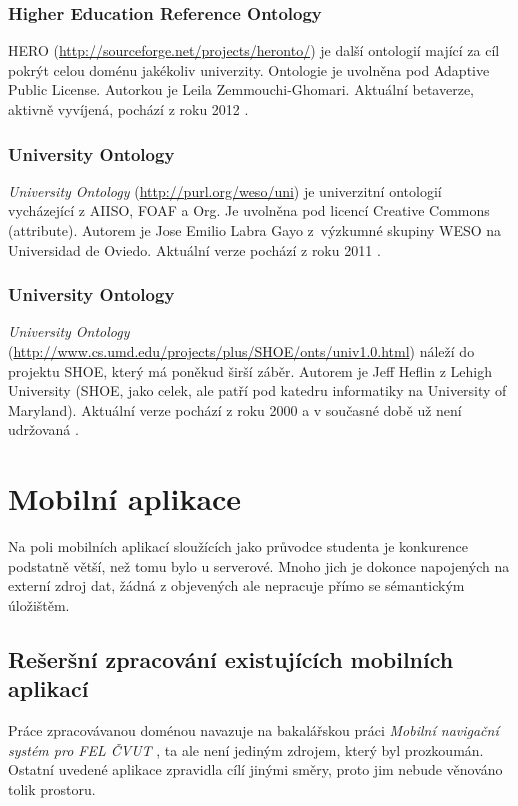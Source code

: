 \subsubsection{Higher Education Reference Ontology}
\Gls{HERO} (\url{http://sourceforge.net/projects/heronto/}) je další ontologií mající za cíl pokrýt celou doménu jakékoliv univerzity. Ontologie je uvolněna pod Adaptive Public License. Autorkou je Leila Zemmouchi-Ghomari. Aktuální betaverze, aktivně vyvíjená, pochází z roku 2012 \cite{Hero}.

\subsubsection{University Ontology}
\emph{University Ontology} (\url{http://purl.org/weso/uni}) je univerzitní ontologií vycházející z \gls{AIISO}, \gls{FOAF} a \gls{Org}. Je uvolněna pod licencí Creative Commons (attribute). Autorem je Jose Emilio Labra Gayo z~výzkumné skupiny WESO na Universidad de Oviedo. Aktuální verze pochází z roku 2011 \cite{Weso}.

\subsubsection{University Ontology}
\emph{University Ontology} (\url{http://www.cs.umd.edu/projects/plus/SHOE/onts/univ1.0.html}) náleží do projektu \gls{SHOE}, který má poněkud širší záběr. Autorem je Jeff Heflin z Lehigh University (\gls{SHOE}, jako celek, ale patří pod katedru informatiky na University of Maryland). Aktuální verze pochází z roku 2000 a v současné době už není udržovaná \cite{Shoe}.


\section{Mobilní aplikace}
Na poli mobilních aplikací sloužících jako průvodce studenta je konkurence podstatně větší, než tomu bylo u serverové. Mnoho jich je dokonce napojených na externí zdroj dat, žádná z objevených ale nepracuje přímo se sémantickým úložištěm.

\subsection{Rešeršní zpracování existujících mobilních aplikací}
Práce zpracovávanou doménou navazuje na bakalářskou práci \textit{Mobilní navigační systém pro FEL ČVUT} \cite{Bakalarka}, ta ale není jediným zdrojem, který byl prozkoumán. Ostatní uvedené aplikace zpravidla cílí jinými směry, proto jim nebude věnováno tolik prostoru.

